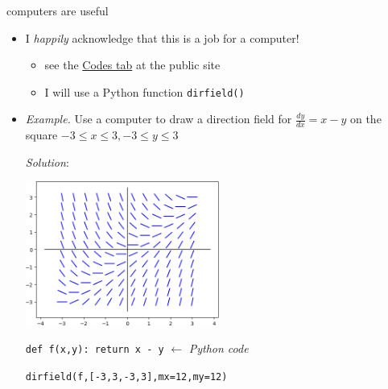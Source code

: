 \documentclass[colorlinks]{beamer}
\begin{document}
\begin{frame}{computers are useful}

\begin{itemize}
\item I \emph{happily} acknowledge that this is a job for a computer!
    \begin{itemize}
    \item see the \href{https://bueler.github.io/math302/codes.html}{Codes tab} at the public site
    \item I will use a Python function \texttt{dirfield()}
    \end{itemize}

\medskip
\item \emph{Example.}  Use a computer to draw a direction field for
$\frac{dy}{dx} = x-y$ on the square $-3 \le x \le 3, -3 \le y \le 3$

\bigskip
\emph{Solution}:

\vspace{-3mm}
\hfill \includegraphics[width=0.5\textwidth]{figs/example-field} \phantom{as dfjadl dsf}

\medskip
\scriptsize
\texttt{def f(x,y):  return x - y}  \hfill $\longleftarrow$ \emph{Python code}

\texttt{dirfield(f,[-3,3,-3,3],mx=12,my=12)}
\end{itemize}
\end{frame}
\end{document}
